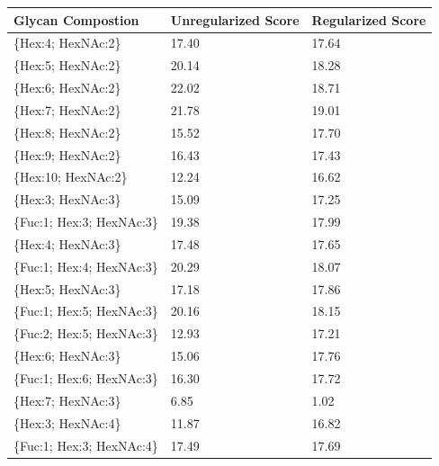 \begin{table}
\begin{minipage}[t]{0.55\linewidth}
    \begin{footnotesize}
    \begin{tabular}{l|p{2cm} p{2cm}}
Glycan Compostion &  Unregularized Score &  Regularized Score \\
\hline
\{Hex:4; HexNAc:2\}                   &                17.40 &              17.64 \\
\{Hex:5; HexNAc:2\}                   &                20.14 &              18.28 \\
\{Hex:6; HexNAc:2\}                   &                22.02 &              18.71 \\
\{Hex:7; HexNAc:2\}                   &                21.78 &              19.01 \\
\{Hex:8; HexNAc:2\}                   &                15.52 &              17.70 \\
\{Hex:9; HexNAc:2\}                   &                16.43 &              17.43 \\
\{Hex:10; HexNAc:2\}                  &                12.24 &              16.62 \\
\{Hex:3; HexNAc:3\}                   &                15.09 &              17.25 \\
\{Fuc:1; Hex:3; HexNAc:3\}            &                19.38 &              17.99 \\
\{Hex:4; HexNAc:3\}                   &                17.48 &              17.65 \\
\{Fuc:1; Hex:4; HexNAc:3\}            &                20.29 &              18.07 \\
\{Hex:5; HexNAc:3\}                   &                17.18 &              17.86 \\
\{Fuc:1; Hex:5; HexNAc:3\}            &                20.16 &              18.15 \\
\{Fuc:2; Hex:5; HexNAc:3\}            &                12.93 &              17.21 \\
\{Hex:6; HexNAc:3\}                   &                15.06 &              17.76 \\
\{Fuc:1; Hex:6; HexNAc:3\}            &                16.30 &              17.72 \\
\{Hex:7; HexNAc:3\}                   &                 6.85 &               1.02 \\
\{Hex:3; HexNAc:4\}                   &                11.87 &              16.82 \\
\{Fuc:1; Hex:3; HexNAc:4\}            &                17.49 &              17.69 \\

\end{tabular}
\end{footnotesize}
\end{minipage}
\end{table}
